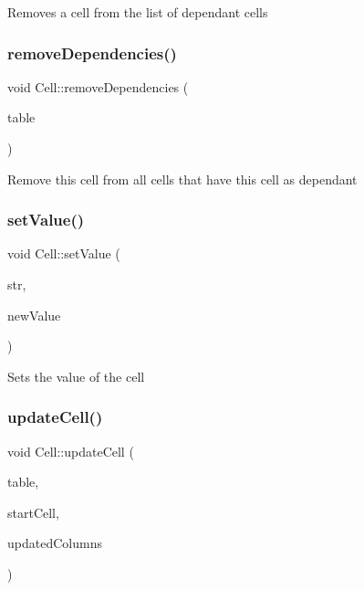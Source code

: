 Removes a cell from the list of dependant cells \mbox{\label{classCell_a7656cf97851d5647e9714c482252801c}} 
\subsubsection{\texorpdfstring{remove\+Dependencies()}{removeDependencies()}}
{\footnotesize\ttfamily void Cell\+::remove\+Dependencies (\begin{DoxyParamCaption}\item[{\hyperlink{classTable}{Table} \&}]{table }\end{DoxyParamCaption})}

Remove this cell from all cells that have this cell as dependant \mbox{\label{classCell_a27872e2747e4a5ba9cce8c7e2c8cfb68}} 
\subsubsection{\texorpdfstring{set\+Value()}{setValue()}}
{\footnotesize\ttfamily void Cell\+::set\+Value (\begin{DoxyParamCaption}\item[{const std\+::string \&}]{str,  }\item[{const std\+::shared\+\_\+ptr$<$ \hyperlink{classCellValue}{Cell\+Value} $>$ \&}]{new\+Value }\end{DoxyParamCaption})}

Sets the value of the cell \mbox{\label{classCell_acfa77320d94a5897030a9113d6d9cc7e}} 
\subsubsection{\texorpdfstring{update\+Cell()}{updateCell()}}
{\footnotesize\ttfamily void Cell\+::update\+Cell (\begin{DoxyParamCaption}\item[{\hyperlink{classTable}{Table} \&}]{table,  }\item[{const std\+::shared\+\_\+ptr$<$ \hyperlink{classCell}{Cell} $>$ \&}]{start\+Cell,  }\item[{std\+::vector$<$ size\+\_\+t $>$ \&}]{updated\+Columns }\end{DoxyParamCaption})}

